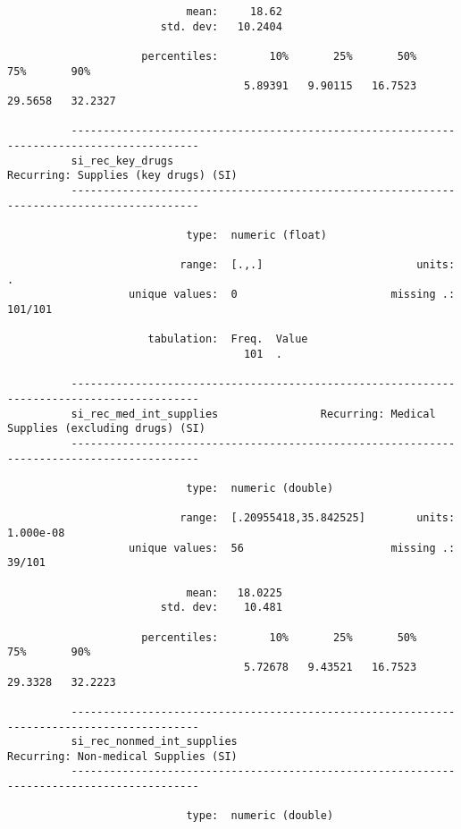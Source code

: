 \documentclass{article}
\begin{document}
\begin{verbatim}
                            mean:     18.62
                        std. dev:   10.2404
          
                     percentiles:        10%       25%       50%       75%       90%
                                     5.89391   9.90115   16.7523   29.5658   32.2327
          
          ------------------------------------------------------------------------------------------
          si_rec_key_drugs                                      Recurring: Supplies (key drugs) (SI)
          ------------------------------------------------------------------------------------------
          
                            type:  numeric (float)
          
                           range:  [.,.]                        units:  .
                   unique values:  0                        missing .:  101/101
          
                      tabulation:  Freq.  Value
                                     101  .
          
          ------------------------------------------------------------------------------------------
          si_rec_med_int_supplies                Recurring: Medical Supplies (excluding drugs) (SI)
          ------------------------------------------------------------------------------------------
          
                            type:  numeric (double)
          
                           range:  [.20955418,35.842525]        units:  1.000e-08
                   unique values:  56                       missing .:  39/101
          
                            mean:   18.0225
                        std. dev:    10.481
          
                     percentiles:        10%       25%       50%       75%       90%
                                     5.72678   9.43521   16.7523   29.3328   32.2223
          
          ------------------------------------------------------------------------------------------
          si_rec_nonmed_int_supplies                            Recurring: Non-medical Supplies (SI)
          ------------------------------------------------------------------------------------------
          
                            type:  numeric (double)
          

\end{verbatim}
\end{document}
